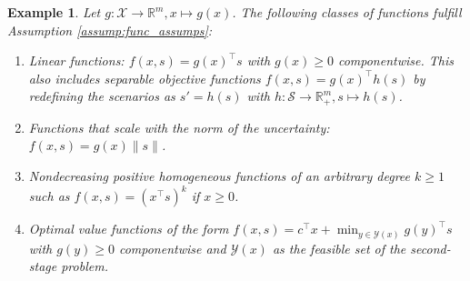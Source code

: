 \documentclass{article}
\newtheorem{example}{Example}[section]
\newcommand{\mX}{\mathcal{X}}
\newcommand{\mY}{\mathcal{Y}}
\newcommand{\mS}{\mathcal{S}}
\newcommand{\R}{\mathbb{R}}
\begin{document}
\begin{example}
	Let $g\colon \mX \rightarrow \R^{m}, x \mapsto g(x)$. The following classes of functions fulfill Assumption \ref{assump:func_assumps}:
	\begin{enumerate}[label= (\roman*)]
		\item Linear functions: \(f(x,s)=g(x)^\top s\) with $g(x)\geq 0$ componentwise. This also includes separable objective functions $f(x,s)=g(x)^\top h(s)$ by redefining the scenarios as $s' = h(s)$ with $h\colon \mS \rightarrow \R_+^{m}, s \mapsto h(s)$.
		\item Functions that scale with the norm of the uncertainty: \(f(x,s) = g(x)\|s\|\).
		\item Nondecreasing positive homogeneous functions of an arbitrary degree \(k\geq 1\) such as \(f(x,s) = (x^{\top}  s)^k\) if \(x \geq 0\).%
		\item Optimal value functions of the form $f(x,s)=c^\top x + \min_{y\in \mY(x)} g(y)^\top s$ with $g(y)\geq 0$ componentwise and $\mY(x)$ as the feasible set of the second-stage problem.
	\end{enumerate} 
	
	

	
	
	
\end{example}
\end{document}
